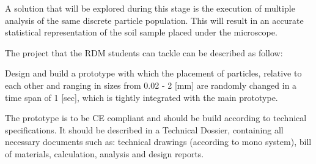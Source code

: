 A solution that will be explored during this stage is the execution of multiple analysis of the same discrete particle population. This will result in an accurate statistical representation of the soil sample placed under the microscope.

The project that the RDM students can tackle can be described as follow:
\begin{sBox}
	Design and build a prototype with which the placement of particles, relative to each other and ranging in sizes from 0.02 - 2 [mm] are randomly changed in a time span of 1 [sec], which is tightly integrated with the main prototype. 
\end{sBox}

The prototype is to be CE compliant and should be build according to technical specifications. It should be described in a Technical Dossier, containing all necessary documents such as: technical drawings (according to mono system), bill of materials, calculation, analysis and design reports.
